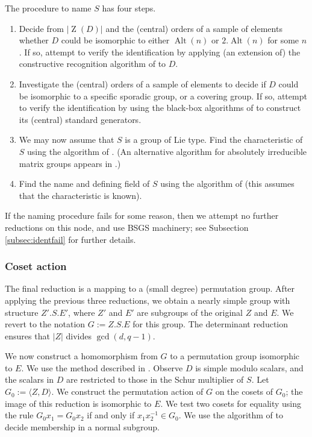 \documentclass[12pt,twoside,reqno,psamsfonts]{amsproc}
\newcommand{\comment}[1]{\marginpar{\begin{center}\scriptsize{#1}\end{center}}}
\numberwithin{equation}{section}
\numberwithin{figure}{section}
\newcounter{algorithm}
\theoremstyle{plain}
\theoremstyle{definition}
\theoremstyle{remark}
\providecommand{\abs}[1]{\left\lvert #1 \right\rvert}
\providecommand{\Alt}[1]{\operatorname{Alt}( #1 )}
\DeclareMathOperator{\Zent}{Z}
\begin{document}
The procedure to name $S$ has four steps.
\begin{enumerate}
\item 
Decide from
$\abs{\Zent (D)}$ and the (central) orders of a sample of elements 
whether $D$ could be isomorphic to either $\Alt{n}$ or $2{.}\Alt{n}$
for some $n$. If so, attempt to verify the identification by
applying (an extension of) the constructive recognition algorithm
of \cite{MR1743388} to $D$. 

\item Investigate the (central) orders of a sample of elements to decide
  if $D$ could be isomorphic to a specific sporadic group, 
  or a covering group.
  If so, attempt to verify the identification by using the 
  black-box algorithms of \cite{atlas_www}
  to construct its (central) standard generators.

\item We may now assume that $S$ is a group of Lie type.
Find the characteristic of $S$ using the algorithm 
of \cite{blackbox_char}. (An alternative algorithm for 
absolutely irreducible matrix groups appears in \cite{KS09}.)

\item Find the name and defining field of $S$ using
the algorithm of \cite{general_recognition} 
(this assumes that the characteristic is known).
\end{enumerate}

\comment{DFH: added final paragraph.} 
If the naming procedure fails for some reason, then we attempt no further
reductions on this node, and use BSGS machinery;
see Subsection \ref {subsec:identfail} for further details.

\subsubsection{Coset action}
\label{subsection:coset_action}
The final reduction is
a mapping to a (small degree) permutation group. 
After applying the previous three reductions, we obtain a nearly simple group
with structure $Z'.S.E'$, where $Z'$ and $E'$ are subgroups
of the original $Z$ and $E$. We revert to the notation $G := Z.S.E$ for
this group.  The determinant reduction ensures that
$\abs{Z}$ divides $\gcd(d, q - 1)$.

We now construct a homomorphism from
$G$ to a permutation group isomorphic to $E$.
We use the method described in \cite{MR2429998}.
Observe $D$ is simple modulo scalars, and the scalars 
in $D$ are restricted to those in the Schur multiplier of $S$.
Let $G_0 := \langle Z, D \rangle$.  We construct the permutation action 
of $G$ on the cosets of $G_0$; 
the image of this reduction is isomorphic to $E$. 
We test two cosets for equality using the rule
$G_0 x_1 = G_0 x_2$ if and only if $x_1 x_2^{-1} \in G_0$.
We use the algorithm of \cite{MR1925006} to decide 
membership in a normal subgroup.
\end{document}
